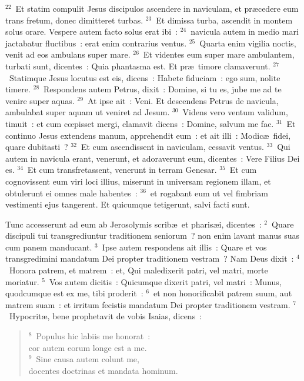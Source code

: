 ${}^{22}$~Et statim compulit Jesus discipulos ascendere in naviculam, et pr\ae cedere eum trans fretum, donec dimitteret turbas.
${}^{23}$~Et dimissa turba, ascendit in montem solus orare. Vespere autem facto solus erat ibi~:
${}^{24}$~navicula autem in medio mari jactabatur fluctibus~: erat enim contrarius ventus.
${}^{25}$~Quarta enim vigilia noctis, venit ad eos ambulans super mare.
${}^{26}$~Et videntes eum super mare ambulantem, turbati sunt, dicentes~: Quia phantasma est. Et pr\ae\ timore clamaverunt.
${}^{27}$~Statimque Jesus locutus est eis, dicens~: Habete fiduciam~: ego sum, nolite timere.
${}^{28}$~Respondens autem Petrus, dixit~: Domine, si tu es, jube me ad te venire super aquas.
${}^{29}$~At ipse ait~: Veni. Et descendens Petrus de navicula, ambulabat super aquam ut veniret ad Jesum.
${}^{30}$~Videns vero ventum validum, timuit~: et cum cœpisset mergi, clamavit dicens~: Domine, salvum me fac.
${}^{31}$~Et continuo Jesus extendens manum, apprehendit eum~: et ait illi~: Modic\ae\ fidei, quare dubitasti~?
${}^{32}$~Et cum ascendissent in naviculam, cessavit ventus.
${}^{33}$~Qui autem in navicula erant, venerunt, et adoraverunt eum, dicentes~: Vere Filius Dei es.
${}^{34}$~Et cum transfretassent, venerunt in terram Genesar.
${}^{35}$~Et cum cognovissent eum viri loci illius, miserunt in universam regionem illam, et obtulerunt ei omnes male habentes~:
${}^{36}$~et rogabant eum ut vel fimbriam vestimenti ejus tangerent. Et quicumque tetigerunt, salvi facti sunt.

\lettrine[lines=10,image=true,loversize=0.05,lraise=-0.03]{T}{}unc accesserunt ad eum ab Jerosolymis scrib\ae\ et pharis\ae i, dicentes~:
${}^{2}$~Quare discipuli tui transgrediuntur traditionem seniorum~? non enim lavant manus suas cum panem manducant.
${}^{3}$~Ipse autem respondens ait illis~: Quare et vos transgredimini mandatum Dei propter traditionem vestram~? Nam Deus dixit~:
${}^{4}$~Honora patrem, et matrem~: et, Qui maledixerit patri, vel matri, morte moriatur.
${}^{5}$~Vos autem dicitis~: Quicumque dixerit patri, vel matri~: Munus, quodcumque est ex me, tibi proderit~:
${}^{6}$~et non honorificabit patrem suum, aut matrem suam~: et irritum fecistis mandatum Dei propter traditionem vestram.
${}^{7}$~Hypocrit\ae , bene prophetavit de vobis Isaias, dicens~:
\begin{flushleft}\begin{verse}${}^{8}$~Populus hic labiis me honorat~:\\ cor autem eorum longe est a me.\\
${}^{9}$~Sine causa autem colunt me,\\ docentes doctrinas et mandata hominum.\end{verse}\end{flushleft}


